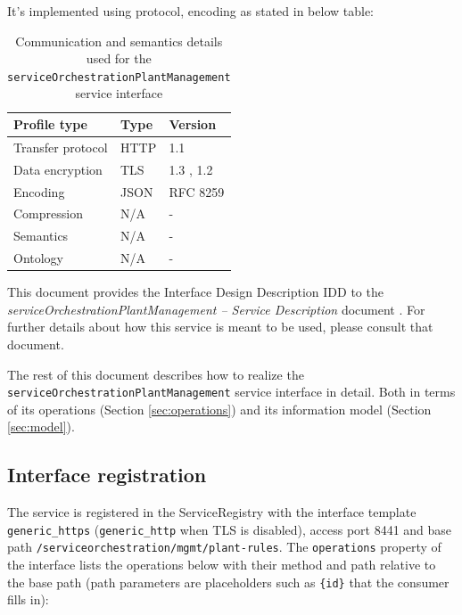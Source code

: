 \documentclass[a4paper]{arrowhead}
\begin{document}
It's implemented using protocol, encoding as stated in below table:
\begin{table}[ht!]
  \centering
  \begin{tabular}{|l|l|l|}
    \hline
    \rowcolor{gray!33} Profile type & Type & Version \\ \hline
    Transfer protocol & HTTP & 1.1 \cite{rfc9112} \\ \hline
    Data encryption & TLS & 1.3 \cite{rfc8446}, 1.2 \cite{rfc5246} \\ \hline
    Encoding & JSON & RFC 8259 \cite{rfc8259} \\ \hline
    Compression & N/A & - \\ \hline
    Semantics & N/A & - \\ \hline
    Ontology & N/A & - \\ \hline
  \end{tabular}
  \caption{Communication and semantics details used for the \texttt{service\allowbreak{}Orchestration\allowbreak{}Plant\allowbreak{}Management} service interface}
  \label{tab:comunication_semantics_profile}
\end{table}

This document provides the Interface Design Description IDD to the \textit{serviceOrchestrationPlantManagement -- Service Description} document \cite{dso-serviceOrchestrationPlantManagement-sd}.
For further details about how this service is meant to be used, please consult that document.

The rest of this document describes how to realize the \texttt{service\allowbreak{}Orchestration\allowbreak{}Plant\allowbreak{}Management} service
interface in detail. Both in terms of its operations (Section \ref{sec:operations}) and its information model (Section \ref{sec:model}).

\subsection{Interface registration}

The service is registered in the ServiceRegistry with the interface template \texttt{generic\_\allowbreak{}https} (\texttt{generic\_\allowbreak{}http} when TLS is disabled), access port 8441 and base path \texttt{/\allowbreak{}serviceorchestration/\allowbreak{}mgmt/\allowbreak{}plant-\allowbreak{}rules}. The \texttt{operations} property of the interface lists the operations below with their method and path relative to the base path (path parameters are placeholders such as \texttt{\{id\}} that the consumer fills in):
\end{document}
